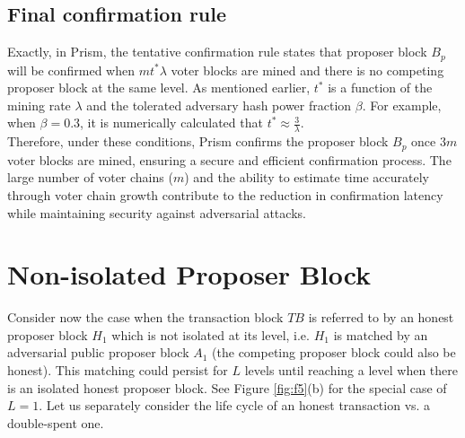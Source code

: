 \subsection{Final confirmation rule}
Exactly, in Prism, the tentative confirmation rule states that proposer block $B_{p}$ will be confirmed when $mt^{\ast}\lambda$ voter blocks are mined and there is no competing proposer block at the same level. As mentioned earlier, $t^{\ast}$ is a function of the mining rate $\lambda$ and the tolerated adversary hash power fraction $\beta$. For example, when $\beta = 0.3$, it is numerically calculated that $t^{\ast} \approx \frac{3}{\lambda}$.\\
Therefore, under these conditions, Prism confirms the proposer block $B_{p}$ once $3m$ voter blocks are mined, ensuring a secure and efficient confirmation process. The large number of voter chains ($m$) and the ability to estimate time accurately through voter chain growth contribute to the reduction in confirmation latency while maintaining security against adversarial attacks.
\section{Non-isolated Proposer Block}
Consider now the case when the transaction block $TB$ is referred to by an honest proposer block $H_{1}$  which is not isolated at its level, i.e. $H_{1}$ is matched by an adversarial public proposer block $A_{1}$ (the competing proposer block could also be honest). This matching could persist for $L$ levels until reaching a level when there is an isolated honest proposer block. See Figure \ref{fig:f5}(b) for the special case of $L = 1$. Let us separately consider the life cycle of an honest transaction vs. a double-spent one.
